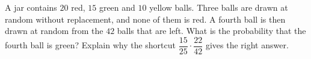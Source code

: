 A jar contains $20$ red, $15$ green and $10$ yellow balls. Three balls are drawn at random without replacement, and none of them is red. A fourth ball is then drawn at random from the $42$ balls that are left. What is the probability that the fourth ball is green? Explain why the shortcut $\dfrac{15}{25}\cdot\dfrac{22}{42}$ gives the right answer.
